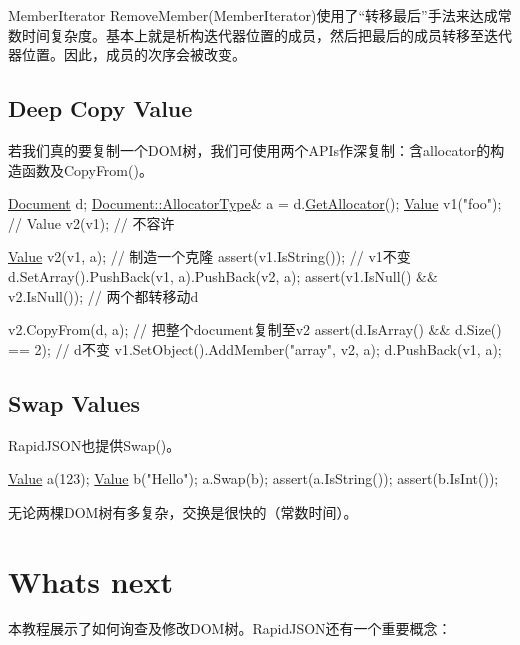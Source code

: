 {\ttfamily Member\+Iterator Remove\+Member(\+Member\+Iterator)}使用了“转移最后”手法来达成常数时间复杂度。基本上就是析构迭代器位置的成员，然后把最后的成员转移至迭代器位置。因此，成员的次序会被改变。\hypertarget{md_Cadriciel_Commun_Externe_RapidJSON_doc_tutorial.zh-cn_DeepCopyValue}{}\subsection{Deep Copy Value}\label{md_Cadriciel_Commun_Externe_RapidJSON_doc_tutorial.zh-cn_DeepCopyValue}
若我们真的要复制一个\+D\+O\+M树，我们可使用两个\+A\+P\+Is作深复制：含allocator的构造函数及{\ttfamily Copy\+From()}。


\begin{DoxyCode}
\hyperlink{class_generic_document}{Document} d;
\hyperlink{class_generic_document_a35155b912da66ced38d22e2551364c57}{Document::AllocatorType}& a = d.\hyperlink{class_generic_document_aa4609d6b19f86aec1a6b96edf2c27686}{GetAllocator}();
\hyperlink{class_generic_value}{Value} v1(\textcolor{stringliteral}{"foo"});
\textcolor{comment}{// Value v2(v1); // 不容许}

\hyperlink{class_generic_value}{Value} v2(v1, a);                      \textcolor{comment}{// 制造一个克隆}
assert(v1.IsString());                \textcolor{comment}{// v1不变}
d.SetArray().PushBack(v1, a).PushBack(v2, a);
assert(v1.IsNull() && v2.IsNull());   \textcolor{comment}{// 两个都转移动d}

v2.CopyFrom(d, a);                    \textcolor{comment}{// 把整个document复制至v2}
assert(d.IsArray() && d.Size() == 2); \textcolor{comment}{// d不变}
v1.SetObject().AddMember(\textcolor{stringliteral}{"array"}, v2, a);
d.PushBack(v1, a);
\end{DoxyCode}
\hypertarget{md_Cadriciel_Commun_Externe_RapidJSON_doc_tutorial.zh-cn_SwapValues}{}\subsection{Swap Values}\label{md_Cadriciel_Commun_Externe_RapidJSON_doc_tutorial.zh-cn_SwapValues}
Rapid\+J\+S\+O\+N也提供{\ttfamily Swap()}。


\begin{DoxyCode}
\hyperlink{class_generic_value}{Value} a(123);
\hyperlink{class_generic_value}{Value} b(\textcolor{stringliteral}{"Hello"});
a.Swap(b);
assert(a.IsString());
assert(b.IsInt());
\end{DoxyCode}


无论两棵\+D\+O\+M树有多复杂，交换是很快的（常数时间）。\hypertarget{md_Cadriciel_Commun_Externe_RapidJSON_doc_tutorial.zh-cn_WhatsNext}{}\section{What\textquotesingle{}s next}\label{md_Cadriciel_Commun_Externe_RapidJSON_doc_tutorial.zh-cn_WhatsNext}
本教程展示了如何询查及修改\+D\+O\+M树。\+Rapid\+J\+S\+O\+N还有一个重要概念：


